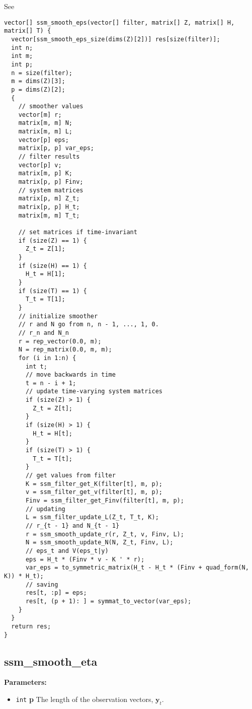 \documentclass[]{book}
\providecommand{\tightlist}{%
  \setlength{\itemsep}{0pt}\setlength{\parskip}{0pt}}
\renewcommand{\vec}[1]{\boldsymbol{#1}}
\begin{document}
See \autocite[Sec 4.5.3 (eq 4.69)]{DurbinKoopman2012}

\begin{verbatim}
vector[] ssm_smooth_eps(vector[] filter, matrix[] Z, matrix[] H, matrix[] T) {
  vector[ssm_smooth_eps_size(dims(Z)[2])] res[size(filter)];
  int n;
  int m;
  int p;
  n = size(filter);
  m = dims(Z)[3];
  p = dims(Z)[2];
  {
    // smoother values
    vector[m] r;
    matrix[m, m] N;
    matrix[m, m] L;
    vector[p] eps;
    matrix[p, p] var_eps;
    // filter results
    vector[p] v;
    matrix[m, p] K;
    matrix[p, p] Finv;
    // system matrices
    matrix[p, m] Z_t;
    matrix[p, p] H_t;
    matrix[m, m] T_t;

    // set matrices if time-invariant
    if (size(Z) == 1) {
      Z_t = Z[1];
    }
    if (size(H) == 1) {
      H_t = H[1];
    }
    if (size(T) == 1) {
      T_t = T[1];
    }
    // initialize smoother
    // r and N go from n, n - 1, ..., 1, 0.
    // r_n and N_n
    r = rep_vector(0.0, m);
    N = rep_matrix(0.0, m, m);
    for (i in 1:n) {
      int t;
      // move backwards in time
      t = n - i + 1;
      // update time-varying system matrices
      if (size(Z) > 1) {
        Z_t = Z[t];
      }
      if (size(H) > 1) {
        H_t = H[t];
      }
      if (size(T) > 1) {
        T_t = T[t];
      }
      // get values from filter
      K = ssm_filter_get_K(filter[t], m, p);
      v = ssm_filter_get_v(filter[t], m, p);
      Finv = ssm_filter_get_Finv(filter[t], m, p);
      // updating
      L = ssm_filter_update_L(Z_t, T_t, K);
      // r_{t - 1} and N_{t - 1}
      r = ssm_smooth_update_r(r, Z_t, v, Finv, L);
      N = ssm_smooth_update_N(N, Z_t, Finv, L);
      // eps_t and V(eps_t|y)
      eps = H_t * (Finv * v - K ' * r);
      var_eps = to_symmetric_matrix(H_t - H_t * (Finv + quad_form(N, K)) * H_t);
      // saving
      res[t, :p] = eps;
      res[t, (p + 1): ] = symmat_to_vector(var_eps);
    }
  }
  return res;
}
\end{verbatim}

\subsection{ssm\_smooth\_eta}\label{ssmux5fsmoothux5feta}

\textbf{Parameters:}

\begin{itemize}
\tightlist
\item
  \texttt{int} \textbf{p} The length of the observation vectors,
  \(\vec{y}_t\).
\end{itemize}
\end{document}
